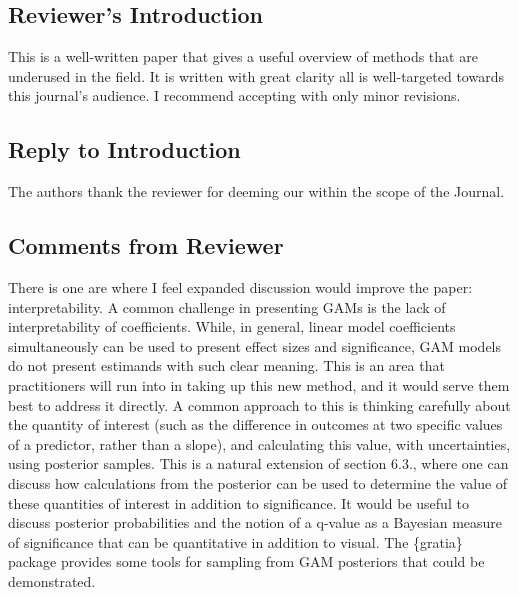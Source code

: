 \documentclass[
]{article}
\begin{document}
\hypertarget{reviewers-introduction-1}{%
\subsection{Reviewer's Introduction}\label{reviewers-introduction-1}}

This is a well-written paper that gives a useful overview of methods that are underused in the field. It is written with great clarity all is well-targeted towards this journal's audience. I recommend accepting with only minor revisions.

\hypertarget{section-39}{%
\subsection{\texorpdfstring{\textcolor{reviewersblue} {Reply to Introduction}}{}}\label{section-39}}

The authors thank the reviewer for deeming our within the scope of the Journal.

\hypertarget{comments-from-reviewer-1}{%
\subsection{Comments from Reviewer}\label{comments-from-reviewer-1}}

There is one are where I feel expanded discussion would improve the paper: interpretability. A common challenge in presenting GAMs is the lack of interpretability of coefficients. While, in general, linear model coefficients simultaneously can be used to present effect sizes and significance, GAM models do not present estimands with such clear meaning. This is an area that practitioners will run into in taking up this new method, and it would serve them best to address it directly. A common approach to this is thinking carefully about the quantity of interest (such as the difference in outcomes at two specific values of a predictor, rather than a slope), and calculating this value, with uncertainties, using posterior samples. This is a natural extension of section 6.3., where one can discuss how calculations from the posterior can be used to determine the value of these quantities of interest in addition to significance. It would be useful to discuss posterior probabilities and the notion of a q-value as a Bayesian measure of significance that can be quantitative in addition to visual. The \{gratia\} package provides some tools for sampling from GAM posteriors that could be demonstrated.
\end{document}
